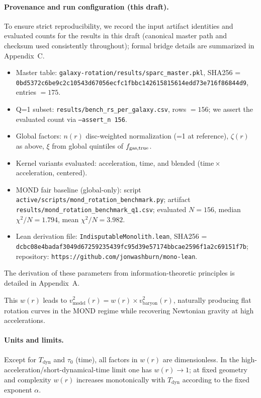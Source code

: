 \documentclass[fleqn,usenatbib]{mnras}
\begin{document}
\paragraph{Provenance and run configuration (this draft).} To ensure strict reproducibility, we record the input artifact identities and evaluated counts for the results in this draft (canonical master path and checksum used consistently throughout); formal bridge details are summarized in Appendix~C.
\begin{itemize}
  \item Master table: \texttt{galaxy-rotation/results/sparc\_master.pkl}, SHA256 = \texttt{0bd5372c6be9c2c10543d67056ecfc1fbbc142615815614edd73e716f86844d9}, entries $=175$.
  \item Q=1 subset: \texttt{results/bench\_rs\_per\_galaxy.csv}, rows $=156$; we assert the evaluated count via \texttt{--assert\_n 156}.
  \item Global factors: $n(r)$ disc-weighted normalization (=1 at reference), $\zeta(r)$ as above, $\xi$ from global quintiles of $f_{\rm gas,true}$.
  \item Kernel variants evaluated: acceleration, time, and blended (time\,$\times$\,acceleration, centered).
  \item MOND fair baseline (global-only): script \texttt{active/scripts/mond\_rotation\_benchmark.py}; artifact \texttt{results/mond\_rotation\_benchmark\_q1.csv}; evaluated $N=156$, median $\chi^2/N=1.794$, mean $\chi^2/N=3.982$.
  \item Lean derivation file: \texttt{IndisputableMonolith.lean}, SHA256 = \texttt{dcbc08e4badaf3049d67259235439fc95d39e57174bbcae2596f1a2c69151f7b}; repository: \texttt{https://github.com/jonwashburn/mono-lean}.
\end{itemize}

The derivation of these parameters from information-theoretic principles is detailed in Appendix~A.

This $w(r)$ leads to $v^2_\mathrm{model}(r) = w(r) \times v^2_\mathrm{baryon}(r)$, naturally producing flat rotation curves in the MOND regime while recovering Newtonian gravity at high accelerations.

\paragraph{Units and limits.} Except for $T_\mathrm{dyn}$ and $\tau_0$ (time), all factors in $w(r)$ are dimensionless. In the high-acceleration/short-dynamical-time limit one has $w(r)\to 1$; at fixed geometry and complexity $w(r)$ increases monotonically with $T_\mathrm{dyn}$ according to the fixed exponent $\alpha$.
\end{document}
